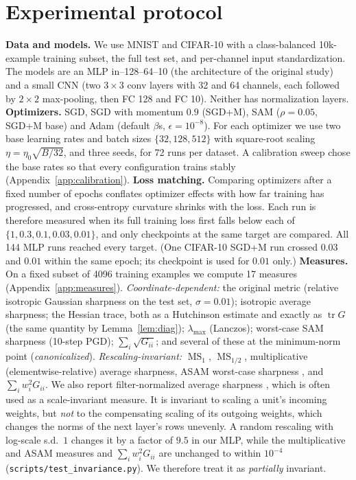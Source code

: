 \documentclass[10pt]{article}
\theoremstyle{remark}
\newcommand{\tr}{\operatorname{tr}}
\newcommand{\MS}{\operatorname{MS}}
\begin{document}
\section{Experimental protocol}\label{sec:protocol}
\textbf{Data and models.} We use MNIST and CIFAR-10 with a class-balanced 10k-example training subset, the full test set, and per-channel input standardization. The models are an MLP in--128--64--10 (the architecture of the original study) and a small CNN (two $3{\times}3$ conv layers with 32 and 64 channels, each followed by $2{\times}2$ max-pooling, then FC 128 and FC 10). Neither has normalization layers.
\textbf{Optimizers.} SGD, SGD with momentum $0.9$ (SGD+M), SAM ($\rho=0.05$, SGD+M base) and Adam (default $\beta$s, $\epsilon=10^{-8}$). For each optimizer we use two base learning rates and batch sizes $\{32,128,512\}$ with square-root scaling $\eta=\eta_0\sqrt{B/32}$, and three seeds, for 72 runs per dataset. A calibration sweep chose the base rates so that every configuration trains stably (Appendix~\ref{app:calibration}).
\textbf{Loss matching.} Comparing optimizers after a fixed number of epochs conflates optimizer effects with how far training has progressed, and cross-entropy curvature shrinks with the loss. Each run is therefore measured when its full training loss first falls below each of $\{1,0.3,0.1,0.03,0.01\}$, and only checkpoints at the same target are compared. All 144 MLP runs reached every target. (One CIFAR-10 SGD+M run crossed $0.03$ and $0.01$ within the same epoch; its checkpoint is used for $0.01$ only.)
\textbf{Measures.} On a fixed subset of 4096 training examples we compute 17 measures (Appendix~\ref{app:measures}).
\emph{Coordinate-dependent:} the original metric (relative isotropic Gaussian sharpness on the test set, $\sigma=0.01$); isotropic average sharpness; the Hessian trace, both as a Hutchinson estimate \citep{hutchinson1989stochastic} and exactly as $\tr G$ (the same quantity by Lemma~\ref{lem:diag}); $\lambda_{\max}$ (Lanczos); worst-case SAM sharpness (10-step PGD); $\sum_i\sqrt{G_{ii}}$; and several of these at the minimum-norm point (\emph{canonicalized}).
\emph{Rescaling-invariant:} $\MS_1$, $\MS_{1/2}$, multiplicative (elementwise-relative) average sharpness, ASAM worst-case sharpness \citep{kwon2021asam}, and $\sum_iw_i^2G_{ii}$. We also report filter-normalized average sharpness \citep{li2018visualizing}, which is often used as a scale-invariant measure. It is invariant to scaling a unit's incoming weights, but \emph{not} to the compensating scaling of its outgoing weights, which changes the norms of the next layer's rows unevenly. A random rescaling with log-scale s.d.\ $1$ changes it by a factor of $9.5$ in our MLP, while the multiplicative and ASAM measures and $\sum_iw_i^2G_{ii}$ are unchanged to within $10^{-4}$ (\texttt{scripts/test\_invariance.py}). We therefore treat it as \emph{partially} invariant.
\end{document}
